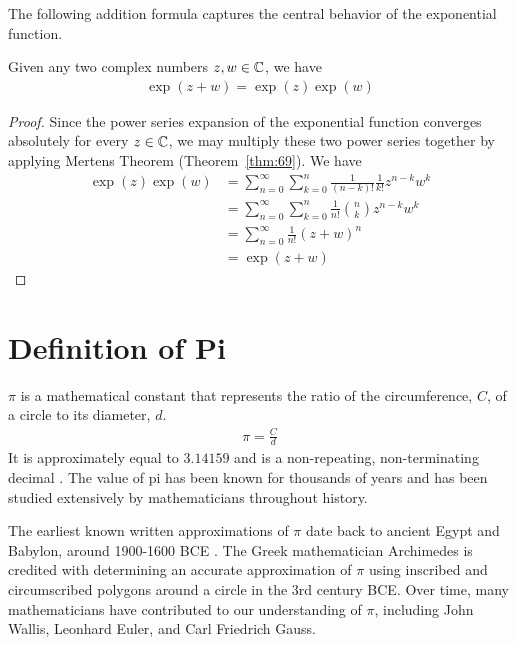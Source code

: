\documentclass[thmcnt=section, 12pt]{my-elegantbook}
\begin{document}

The following addition formula
captures the central behavior of
the exponential function.

\begin{theorem} \label{thm:68}
    Given any two complex numbers $z, w \in \mathbb{C}$, we have
    \begin{align*}
        \exp(z + w) = \exp(z) \exp(w)
    \end{align*}
\end{theorem}

\begin{proof}
    Since the power series expansion of the exponential function
    converges absolutely for every $z \in \mathbb{C}$,
    we may multiply these two power series together
    by applying Mertens Theorem (Theorem~\ref{thm:69}).
    We have
    \begin{align*}
        \exp(z) \exp(w)
         & = \sum_{n=0}^\infty \sum_{k=0}^n
        \frac{1}{(n-k)!} \frac{1}{k!} z^{n-k} w^k \\
         & = \sum_{n=0}^\infty \sum_{k=0}^n
        \frac{1}{n!} \binom{n}{k} z^{n-k} w^k     \\
         & = \sum_{n=0}^\infty
        \frac{1}{n!} (z+w)^n                      \\
         & = \exp(z+w)
    \end{align*}
\end{proof}


\section{Definition of Pi}

$\pi$ is a mathematical constant
that represents the ratio of the circumference, $C$,
of a circle to its diameter, $d$.
\begin{align}
    \pi = \frac{C}{d}
    \label{eq:152}
\end{align}
It is approximately equal to $3.14159$
and is a non-repeating,
non-terminating decimal \cite{weissteinPi}.
The value of pi has been known for thousands of years and has been studied extensively by mathematicians throughout history.

The earliest known written approximations of $\pi$
date back to ancient Egypt and Babylon,
around 1900-1600 BCE \cite{gouldHistoryPi1974}.
The Greek mathematician Archimedes is credited
with determining an accurate approximation of $\pi$
using inscribed and circumscribed polygons
around a circle in the 3rd century BCE.
Over time, many mathematicians have contributed to
our understanding of $\pi$,
including John Wallis, Leonhard Euler, and Carl Friedrich Gauss.
\end{document}
